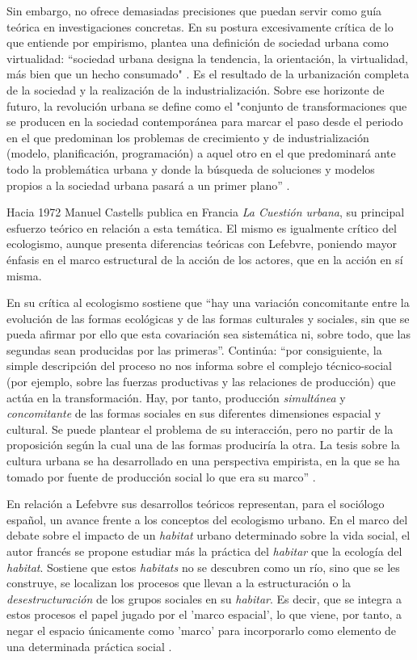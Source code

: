 Sin embargo, no ofrece demasiadas precisiones que puedan servir como guía teórica en investigaciones concretas. En su postura excesivamente crítica de lo que entiende por empirismo, plantea una definición de sociedad urbana como virtualidad: “sociedad urbana designa la tendencia, la orientación, la virtualidad, más bien que un hecho consumado" \cite[p.~8]{lefebvre}. Es el resultado de la urbanización completa de la sociedad y la realización de la industrialización. Sobre ese horizonte de futuro, la revolución urbana se define como el "conjunto de transformaciones que se producen en la sociedad contemporánea para marcar el paso desde el periodo en el que predominan los problemas de crecimiento y de industrialización (modelo, planificación, programación) a aquel otro en el que predominará ante todo la problemática urbana y donde la búsqueda de soluciones y modelos propios a la sociedad urbana pasará a un primer plano” \cite[p.~11]{lefebvre}.

Hacia 1972 Manuel Castells publica en Francia \textit{La Cuestión urbana}, su principal esfuerzo teórico en relación a esta temática. El mismo es igualmente crítico del ecologismo, aunque presenta diferencias teóricas con Lefebvre, poniendo mayor énfasis en el marco estructural de la acción de los actores, que en la acción en sí misma. 

En su crítica al ecologismo  sostiene que “hay una variación concomitante entre la evolución de las formas ecológicas y de las formas culturales y sociales, sin que se pueda afirmar por ello que esta covariación sea sistemática ni, sobre todo, que las segundas sean producidas por las primeras”. Continúa: “por consiguiente, la simple descripción del proceso no nos informa sobre el complejo técnico-social (por ejemplo, sobre las fuerzas productivas y las relaciones de producción) que actúa en la transformación. Hay, por tanto, producción \textit{simultánea} y \textit{concomitante} de las formas sociales en sus diferentes dimensiones espacial y cultural. Se puede plantear el problema de su interacción, pero no partir de la proposición según la cual una de las formas produciría la otra. La tesis sobre la cultura urbana se ha desarrollado en una perspectiva empirista, en la que se ha tomado por fuente de producción social lo que era su marco” \cite[p.~104]{castells} .

En relación a Lefebvre sus desarrollos teóricos representan, para el sociólogo español, un avance frente a los conceptos del ecologismo urbano. En el marco del debate sobre el impacto de un \textit{habitat} urbano determinado sobre la vida social, el autor francés se propone estudiar más la práctica del \textit{habitar} que la ecología del \textit{habitat}. Sostiene que estos \textit{habitats} no se descubren como un río, sino que se les construye, se localizan los procesos que llevan a la estructuración o la \textit{desestructuración} de los grupos sociales en su \textit{habitar}. Es decir, que se integra a estos procesos el papel jugado por el 'marco espacial', lo que viene, por tanto, a negar el espacio únicamente como 'marco' para incorporarlo como elemento de una determinada práctica social \cite[p.~128]{castells}.

